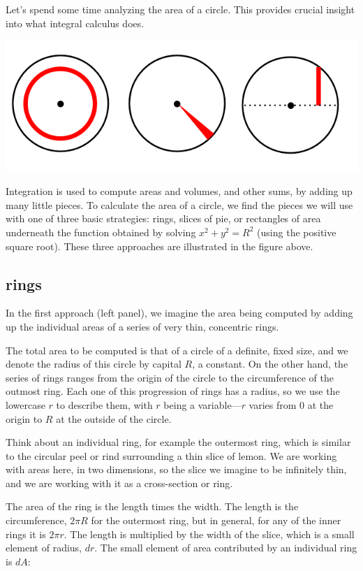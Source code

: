 \documentclass[11pt, oneside]{article}
\begin{document}
Let's spend some time analyzing the area of a circle.  This provides crucial insight into what integral calculus does.

\begin{center}\includegraphics [scale=0.5] {circles3.png}\end{center}

Integration is used to compute areas and volumes, and other sums, by adding up many little pieces.  To calculate the area of a circle, we find the pieces we will use with one of three basic strategies:  rings, slices of pie, or rectangles of area underneath the function obtained by solving $x^2 + y^2 = R^2$ (using the positive square root).  These three approaches are illustrated in the figure above.

\subsection*{rings}
In the first approach (left panel), we imagine the area being computed by adding up the individual areas of a series of very thin, concentric rings.

The total area to be computed is that of a circle of a definite, fixed size, and we denote the radius of this circle by capital $R$, a constant.  On the other hand, the series of rings ranges from the origin of the circle to the circumference of the outmost ring.  Each one of this progression of rings has a radius, so we use the lowercase $r$ to describe them, with $r$ being a variable---$r$ varies from $0$ at the origin to $R$ at the outside of the circle.

Think about an individual ring, for example the outermost ring, which is similar to the circular peel or rind surrounding a thin slice of lemon.  We are working with areas here, in two dimensions, so the slice we imagine to be infinitely thin, and we are working with it as a cross-section or ring.

The area of the ring is the length times the width.  The length is the circumference, $2 \pi R$ for the outermost ring, but in general, for any of the inner rings it is $2 \pi r$. The length is multiplied by the width of the slice, which is a small element of radius, $dr$.  The small element of area contributed by an individual ring is $dA$:
\end{document}
